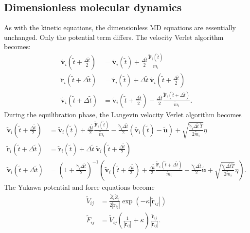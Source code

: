 \documentclass{article}
\begin{document}
\subsection{Dimensionless molecular dynamics}
As with the kinetic equations, the dimensionless MD equations are essentially unchanged. Only the potential term differs. The velocity Verlet algorithm becomes:
\begin{align*}
\tilde{\mathbf{v}}_i\left(\tilde{t}+\frac{\Delta\tilde{t}}{2}\right) &= \tilde{\mathbf{v}}_i(\tilde{t}) + \frac{\Delta\tilde{t}}{2}\frac{\tilde{\mathbf{F}}_i(\tilde{t})}{\tilde{m}_i} \\
\tilde{\mathbf{r}}_i(\tilde{t}+\Delta\tilde{t}) &= \tilde{\mathbf{r}}_i(\tilde{t}) + \Delta\tilde{t}\:\tilde{\mathbf{v}}_i\left(\tilde{t}+\frac{\Delta\tilde{t}}{2}\right) \\
\tilde{\mathbf{v}}_i(\tilde{t}+\Delta\tilde{t}) &= \tilde{\mathbf{v}}_i\left(\tilde{t}+\frac{\Delta\tilde{t}}{2}\right) + \frac{\Delta\tilde{t}}{2}\frac{\tilde{\mathbf{F}}_i(\tilde{t}+\Delta\tilde{t})}{\tilde{m}_i}.
\end{align*}
During the equilibration phase, the Langevin velocity Verlet algorithm becomes
\begin{align*}
\tilde{\mathbf{v}}_i\left(\tilde{t}+\frac{\Delta\tilde{t}}{2}\right) &= \tilde{\mathbf{v}}_i\left(\tilde{t}\right) + \frac{\Delta\tilde{t}}{2}\frac{\tilde{\mathbf{F}}_i\left(\tilde{t}\right)}{\tilde{m}_i} - \frac{\tilde{\gamma}_i\Delta\tilde{t}}{2}\left(\tilde{\mathbf{v}_i}\left(\tilde{t}\right)-\tilde{\mathbf{u}}\right) + \sqrt{\frac{\tilde{\gamma}_i\Delta\tilde{t}\:\tilde{T}}{2\tilde{m}_i}}\eta \\
\tilde{\mathbf{r}}_i\left(\tilde{t}+\Delta\tilde{t}\right) &= \tilde{\mathbf{r}}_i\left(\tilde{t}\right) + \Delta\tilde{t}\:\tilde{\mathbf{v}}_i\left(\tilde{t}+\frac{\Delta\tilde{t}}{2}\right) \\
\tilde{\mathbf{v}}_i\left(\tilde{t}+\Delta\tilde{t}\right) &= \left(1+\frac{\tilde{\gamma}_i\Delta\tilde{t}}{2}\right)^{-1} \left(\tilde{\mathbf{v}}_i\left(\tilde{t}+\frac{\Delta\tilde{t}}{2}\right) + \frac{\Delta\tilde{t}}{2}\frac{\tilde{\mathbf{F}}_i\left(\tilde{t}+\Delta\tilde{t}\right)}{\tilde{m}_i} + \frac{\tilde{\gamma}_i\Delta\tilde{t}}{2}\tilde{\mathbf{u}} + \sqrt{\frac{\tilde{\gamma}_i\Delta\tilde{t}\tilde{T}}{2\tilde{m}_i}}\eta\right).
\end{align*}
The Yukawa potential and force equations become
\begin{align*}
\tilde{V}_{ij} &= \frac{\tilde{Z}_i\tilde{Z}_j}{2|\tilde{\mathbf{r}}_{ij}|} \exp\left(-\kappa|\tilde{\mathbf{r}}_{ij}|\right) \\
\tilde{F}_{ij} &= \tilde{V}_{ij} \left(\frac{1}{|\tilde{\mathbf{r}}_{ij}|} + \kappa\right)\frac{\tilde{\mathbf{r}}_{ij}}{|\tilde{\mathbf{r}}_{ij}|}.
\end{align*}
\end{document}

